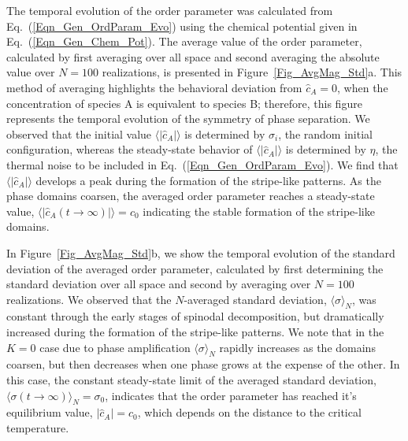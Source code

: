 \documentclass[5p,twocolumn]{elsarticle}
\begin{document}
The temporal evolution of the order parameter was calculated from Eq.~(\ref{Eqn_Gen_OrdParam_Evo}) using the chemical potential given in Eq.~(\ref{Eqn_Gen_Chem_Pot}). The average value of the order parameter, calculated by first averaging over all space and second averaging the absolute value over $N=100$ realizations, is presented in Figure~\ref{Fig_AvgMag_Std}a. This method of averaging highlights the behavioral deviation from $\hat{c}_A=0$, when the concentration of species A is equivalent to species B; therefore, this figure represents the temporal evolution of the symmetry of phase separation. We observed that the initial value $\langle|\hat{c}_A|\rangle$ is determined by $\sigma_i$, the random initial configuration, whereas the steady-state behavior  of $\langle|{\hat{c}}_A|\rangle$ is determined by $\eta$, the thermal noise to be included in Eq.~(\ref{Eqn_Gen_OrdParam_Evo}). We find that $\langle|\hat{c}_A|\rangle$ develops a peak during the formation of the stripe-like patterns. As the phase domains coarsen, the averaged order parameter reaches a steady-state value, $\langle|\hat{c}_A(t\to\infty)|\rangle= c_0$ indicating the stable formation of the stripe-like domains. 

In Figure~\ref{Fig_AvgMag_Std}b, we show the temporal evolution of the standard deviation of the averaged order parameter, calculated by first determining the standard deviation over all space and second by averaging over $N=100$ realizations. We observed that the $N$-averaged standard deviation, $\langle\sigma\rangle_N$, was constant through the early stages of spinodal decomposition, but dramatically increased during the formation of the stripe-like patterns. We note that in the $K=0$ case due to phase amplification $\langle\sigma\rangle_N$ rapidly increases as the domains coarsen, but then decreases when one phase grows at the expense of the other. In this case, the constant steady-state limit of the averaged standard deviation, $\langle\sigma (t\to\infty)\rangle_N = \sigma_0$, indicates that the order parameter has reached it's equilibrium value, $|\hat{c}_A|=c_0$, which depends on the distance to the critical temperature.
\end{document}
